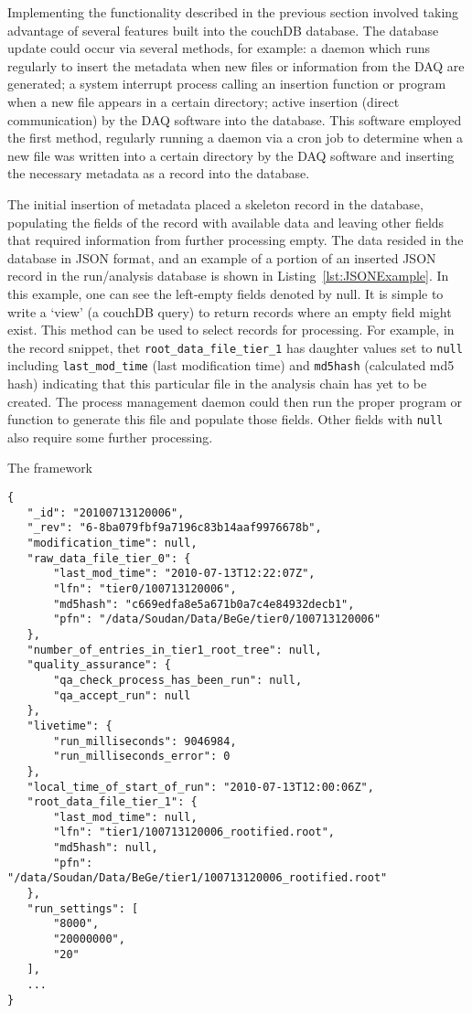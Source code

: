 	Implementing the functionality described in the previous section involved taking advantage of several features built into the couchDB database.  The database update could occur via several methods, for example: a daemon which runs regularly to insert the metadata when new files or information from the DAQ are generated; a system interrupt process calling an insertion function or program when a new file appears in a certain directory; active insertion (direct communication) by the DAQ software into the database.  This software employed the first method, regularly running a daemon via a cron job to determine when a new file was written into a certain directory by the DAQ software and inserting the necessary metadata as a record into the database.  
	
	The initial insertion of metadata placed a skeleton record in the database, populating the fields of the record with available data and leaving other fields that required information from further processing empty.  The data resided in the database in JSON format, and an example of a portion of an inserted JSON record in the run/analysis database is shown in Listing~\ref{lst:JSONExample}.  In this example, one can see the left-empty fields denoted by {\ttfamily null}.  It is simple to write a `view' (a couchDB query) to return records where an empty field might exist.  This method can be used to select records for processing.  For example, in the record snippet, thet \lstinline!root_data_file_tier_1! has daughter values set to \lstinline!null! including \lstinline!last_mod_time! (last modification time) and \lstinline!md5hash! (calculated md5 hash) indicating that this particular file in the analysis chain has yet to be created.  The process management daemon could then run the proper program or function to generate this file and populate those fields.  Other fields with \lstinline!null! also require some further processing.  
	
	The framework 

			\begin{lstlisting}[caption=Truncated example of a JSON record in the run/analysis database., label=lst:JSONExample]
{
   "_id": "20100713120006",
   "_rev": "6-8ba079fbf9a7196c83b14aaf9976678b",
   "modification_time": null,
   "raw_data_file_tier_0": {
       "last_mod_time": "2010-07-13T12:22:07Z",
       "lfn": "tier0/100713120006",
       "md5hash": "c669edfa8e5a671b0a7c4e84932decb1",
       "pfn": "/data/Soudan/Data/BeGe/tier0/100713120006"
   },
   "number_of_entries_in_tier1_root_tree": null,
   "quality_assurance": {
       "qa_check_process_has_been_run": null,
       "qa_accept_run": null
   },
   "livetime": {
       "run_milliseconds": 9046984,
       "run_milliseconds_error": 0
   },
   "local_time_of_start_of_run": "2010-07-13T12:00:06Z",
   "root_data_file_tier_1": {
       "last_mod_time": null,
       "lfn": "tier1/100713120006_rootified.root",
       "md5hash": null,
       "pfn": "/data/Soudan/Data/BeGe/tier1/100713120006_rootified.root"
   },
   "run_settings": [
       "8000",
       "20000000",
       "20"
   ],
   ...
}
			\end{lstlisting}	

